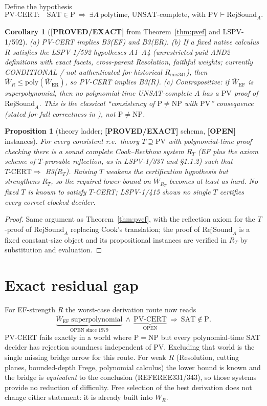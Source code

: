 \documentclass[11pt]{article}
\newtheorem{proposition}[theorem]{Proposition}
\newtheorem{corollary}[theorem]{Corollary}
\theoremstyle{remark}
\newcommand{\SAT}{\mathrm{SAT}}
\newcommand{\EF}{\mathrm{EF}}
\newcommand{\ER}{\mathrm{ER}}
\newcommand{\PV}{\mathrm{PV}}
\newcommand{\Wb}{\overline{W}}
\newcommand{\poly}{\mathrm{poly}}
\newcommand{\RejSound}{\mathrm{RejSound}}
\newcommand{\status}[1]{\textbf{[#1]}}
\begin{document}
Define the hypothesis
\[
 \text{PV-CERT:}\quad \SAT\in\mathrm P\ \Longrightarrow\ \exists A\ \text{polytime, UNSAT-complete, with }\PV\vdash\RejSound_A .
\]

\begin{corollary}[\status{PROVED/EXACT} from Theorem~\ref{thm:pvef} and LSPV-1/592]\label{cor:b3}
(a) PV-CERT implies B3(EF) and B3(ER).
(b) If a fixed native calculus $R$ satisfies the LSPV-1/592 hypotheses A1--A4 (unrestricted paid AND2
definitions with exact facets, cross-parent Resolution, faithful weights; currently CONDITIONAL / not
authenticated for historical $R_{\mathrm{mix341}}$), then $\Wb_R\le\poly(\Wb_{\ER})$, so PV-CERT
implies B3($R$).
(c) Contrapositive: if $\Wb_{\EF}$ is superpolynomial, then no polynomial-time UNSAT-complete $A$ has
a $\PV$ proof of $\RejSound_A$. This is the classical ``consistency of $\mathrm{P}\neq\mathrm{NP}$ with
$\PV$'' consequence (stated for full correctness in \cite{ck07}), not $\mathrm P\neq\mathrm{NP}$.
\end{corollary}

\begin{proposition}[theory ladder; \status{PROVED/EXACT} schema, \status{OPEN} instances]
For every consistent r.e.\ theory $T\supseteq\PV$ with polynomial-time proof checking there is a
sound complete Cook--Reckhow system $R_T$ (EF plus the axiom scheme of $T$-provable reflection,
as in LSPV-1/337 and \cite{ps23} \S1.1.2) such that
$T\text{-CERT}\Rightarrow$ B3($R_T$). Raising $T$ weakens the certification hypothesis but strengthens
$R_T$, so the required lower bound on $\Wb_{R_T}$ becomes at least as hard. No fixed $T$ is known to
satisfy $T$-CERT; LSPV-1/415 shows no single $T$ certifies every correct clocked decider.
\end{proposition}
\begin{proof}
Same argument as Theorem~\ref{thm:pvef}, with the reflection axiom for the $T$-proof of
$\RejSound_A$ replacing Cook's translation; the proof of $\RejSound_A$ is a fixed constant-size object
and its propositional instances are verified in $R_T$ by substitution and evaluation.
\end{proof}

\section{Exact residual gap}
For EF-strength $R$ the worst-case derivation route now reads
\[
 \underbrace{\Wb_{\EF}\ \text{superpolynomial}}_{\text{OPEN since 1979}}
 \ \wedge\ \underbrace{\text{PV-CERT}}_{\text{OPEN}}
 \ \Longrightarrow\ \SAT\notin\mathrm P .
\]
PV-CERT fails exactly in a world where $\mathrm P=\mathrm{NP}$ but every polynomial-time SAT decider
has rejection soundness independent of $\PV$. Excluding that world is the single missing bridge
arrow for this route. For weak $R$ (Resolution, cutting planes, bounded-depth Frege, polynomial
calculus) the lower bound is known and the bridge is \emph{equivalent} to the conclusion
(REFEREE331/343), so those systems provide no reduction of difficulty. Free selection of the best
derivation does not change either statement: it is already built into $W_R$.
\end{document}
